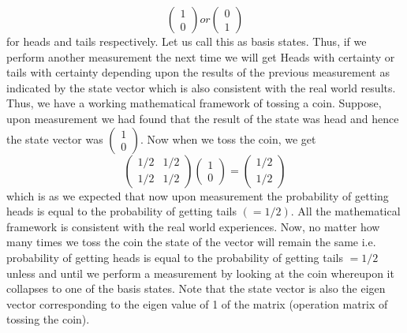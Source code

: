 \[
\begin{pmatrix} 1 \\ 0 \end{pmatrix} or \begin{pmatrix} 0 \\ 1 \end{pmatrix} 
\]
 for heads and tails respectively. Let us call this as basis states. Thus, if we perform another measurement the next time we will get Heads with certainty or tails with certainty depending upon the results of the previous measurement as indicated by the state vector which is also consistent with the real world results. Thus, we have a working mathematical framework of tossing a coin. Suppose, upon measurement we had found that the result of the state was head and hence the state vector was $\begin{pmatrix} 1 \\ 0 \end{pmatrix}$. Now when we toss the coin, we get
 \[
 \begin{pmatrix} 1/2 & 1/2 \\ 1/2 & 1/2 \end{pmatrix} \begin{pmatrix} 1 \\ 0 \end{pmatrix} = \begin{pmatrix} 1/2 \\ 1/2 \end{pmatrix}
 \]
 which is as we expected that now upon measurement the probability of getting heads is equal to the probability of getting tails $(=1/2)$. All the mathematical framework is consistent with the real world experiences. Now, no matter how many times we toss the coin the state of the vector will remain the same i.e. probability of getting heads is equal to the probability of getting tails $=1/2$ unless and until we perform a measurement by looking at the coin whereupon it collapses to one of the basis states.
Note that the state vector is also the eigen vector corresponding to the eigen value of 1 of the matrix (operation matrix of tossing the coin).

